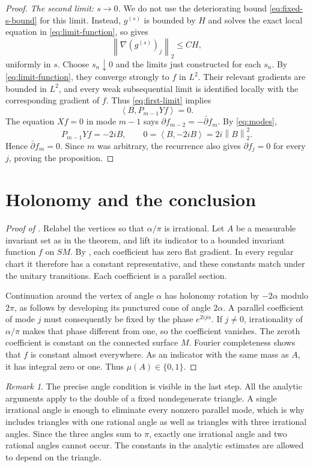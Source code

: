 \documentclass[11pt]{article}
\theoremstyle{remark}
\newtheorem{remark}[theorem]{Remark}
\newcommand{\pa}{\partial}
\newcommand{\pb}{\bar\partial}
\newcommand{\norm}[1]{\left\lVert#1\right\rVert}
\newcommand{\ip}[2]{\left\langle#1,#2\right\rangle}
\begin{document}
\begin{proof}
\medskip\noindent\emph{The second limit: \(s\to0\).}
We do not use the deteriorating bound \eqref{eq:fixed-s-bound} for
this limit. Instead, \(g^{(s)}\) is bounded by \(H\) and solves the
exact local equation in \eqref{eq:limit-function}, so
 gives
\[
 \norm{\nabla(g^{(s)})_j}_2\le CH,
\]
uniformly in \(s\). Choose \(s_n\downarrow0\) and the limits just
constructed for each \(s_n\). By \eqref{eq:limit-function}, they
converge strongly to \(f\) in \(L^2\). Their relevant gradients
are bounded in \(L^2\), and every weak subsequential limit is
identified locally with the corresponding gradient of \(f\).
Thus \eqref{eq:first-limit} implies
\[
 \ip{B}{P_{m-1}Yf}=0.
\]
The equation \(Xf=0\) in mode \(m-1\) says
\(\pa f_{m-2}=-\pb f_m\). By \eqref{eq:modes},
\[
 P_{m-1}Yf=-2iB,\qquad
 0=\ip{B}{-2iB}=2i\norm{B}_2^2.
\]
Hence \(\pb f_m=0\). Since \(m\) was arbitrary, the recurrence
also gives \(\pa f_j=0\) for every \(j\), proving the proposition.
\end{proof}

\section{Holonomy and the conclusion}\label{sec:conclusion}

\begin{proof}[Proof of ]
Relabel the vertices so that \(\alpha/\pi\) is irrational.
Let \(A\) be a measurable invariant set as in the theorem, and lift
its indicator to a bounded invariant function \(f\) on \(SM\).
By , each coefficient has zero flat gradient.
In every regular chart it therefore has a constant representative,
and these constants match under the unitary transitions. Each
coefficient is a parallel section.

Continuation around the vertex of angle \(\alpha\) has holonomy
rotation by \(-2\alpha\) modulo \(2\pi\), as follows by developing
its punctured cone of angle \(2\alpha\). A parallel coefficient of
mode \(j\) must consequently be fixed by the phase
\(e^{2ij\alpha}\). If \(j\ne0\), irrationality of \(\alpha/\pi\)
makes that phase different from one, so the coefficient vanishes.
The zeroth coefficient is constant on the connected surface \(M\).
Fourier completeness shows that \(f\) is constant almost everywhere.
As an indicator with the same mass as \(A\), it has integral zero
or one. Thus \(\mu(A)\in\{0,1\}\).
\end{proof}

\begin{remark}
The precise angle condition is visible in the last step. All the analytic
arguments apply to the double of a fixed nondegenerate triangle. A
single irrational angle is enough to eliminate every nonzero parallel
mode, which is why  includes triangles with one rational
angle as well as triangles with three irrational angles. Since the
three angles sum to \(\pi\), exactly one irrational angle and two
rational angles cannot occur. The constants in the analytic estimates
are allowed to depend on the triangle.
\end{remark}
\end{document}
